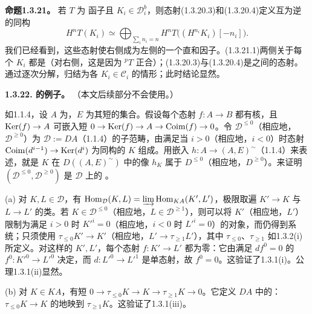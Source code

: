 \par\medskip\noindent\textbf{命题1.3.21。} 若 $T$ 为 函子且 $K_i\in\mathcal D_i^b$，则态射(1.3.20.3)和(1.3.20.4)定义互为逆的同构
\begin{equation*}
 H^nT(K_i)\simeq\bigoplus_{\sum_i n_i=n}H^nT\bigl((H^{n_i}K_i)[-n_i]\bigr).\tag{1.3.21.1}
\end{equation*}
我们已经看到，这些态射使右侧成为左侧的一个直和因子。(1.3.21.1)两侧关于每个 $K_i$ 都是（对右侧，这是因为 ${}^pT$ 正合）；(1.3.20.3)与(1.3.20.4)是之间的态射。通过逐次分解，归结为各 $K_i\in\mathcal C_i$ 的情形；此时结论显然。

\par\medskip\noindent\textbf{1.3.22. 的例子。} （本文后续部分不会使用。）

如1.1.4，设 $A$ 为，$E$ 为其短的集合。假设每个态射 $f:A\to B$ 都有核，且 $\operatorname{Ker}(f)\to A$ 可嵌入短 $0\to\operatorname{Ker}(f)\to A\to\mathrm{Coim}(f)\to0$。令 $\mathcal D^{\leq0}$（相应地，$\mathcal D^{\geq0}$）为 $\mathcal D:=DA$（1.1.4）的子范畴，由满足当 $i>0$（相应地，$i<0$）时态射 $\mathrm{Coim}(d^{i-1})\to\operatorname{Ker}(d^i)$ 为同构的 $K$ 组成。用嵌入 $h:A\to(A,E)^{\sim}$（1.1.4）来表述，就是 $K$ 在 $D((A,E)^{\sim})$ 中的像 $h_K$ 属于 $D^{\leq0}$（相应地，$D^{\geq0}$）。来证明 $(\mathcal D^{\leq0},\mathcal D^{\geq0})$ 是 $\mathcal D$ 上的 。

(a) 对 $K,L\in\mathcal D$，有 $\operatorname{Hom}_{\mathcal D}(K,L)=\varinjlim\operatorname{Hom}_{KA}(K',L')$，极限取遍 $K'\to K$ 与 $L\to L'$ 的类。若 $K\in\mathcal D^{\leq0}$（相应地，$L\in\mathcal D^{\geq1}$），则可以将 $K'$（相应地，$L'$）限制为满足 $i>0$ 时 $K'^i=0$（相应地，$i<0$ 时 $L'^i=0$）的对象，而仍得到系统；只须使用 $\tau_{\leq0}K'\to K'$（相应地，$L'\to\tau_{\geq1}L'$），其中 $\tau_{\leq0}$、$\tau_{\geq1}$ 如1.3.2(i)所定义。对这样的 $K',L'$，每个态射 $f:K'\to L'$ 都为零：它由满足 $df^0=0$ 的 $f^0:K'^0\to L'^0$ 决定，而 $d:L'^0\to L'^1$ 是单态射，故 $f^0=0$。这验证了1.3.1(i)。公理1.3.1(ii)显然。

(b) 对 $K\in KA$，有短 $0\to\tau_{\leq0}K\to K\to\tau_{\geq1}K\to0$。它定义 $DA$ 中的：$\tau_{\leq0}K\to K$ 的地映到 $\tau_{\geq1}K$。这验证了1.3.1(iii)。

